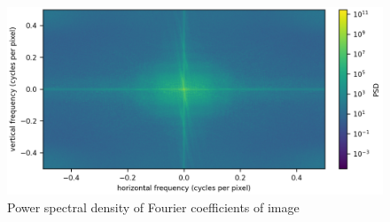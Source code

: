 \documentclass[11pt]{article}
\begin{document}
\setcounter{subsection}{1} %
\subsection{} %
\begin{figure}[H]
    \centering
    \includegraphics[width=6.5in]{3bfig1.png}
    \caption{Power spectral density of Fourier coefficients of image}
    \label{3bfig1}
\end{figure}
\end{document}
